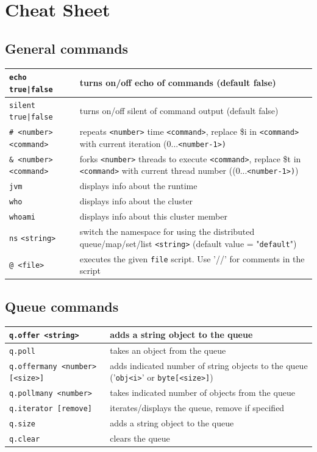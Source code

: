 \section{Cheat Sheet}
\subsection*{General commands}
\begin{tabular}{|p{4cm}|p{9cm}|}
    \hline
    \texttt{echo true|false} & turns on/off echo of commands (default false)\\\hline
    \texttt{silent true|false} & turns on/off silent of command output (default false)\\\hline
    \texttt{\# <number> <command>}& repeats \texttt{<number>} time \texttt{<command>}, replace \$i in \texttt{<command>} with current iteration (0...\texttt{<number-1>)}\\\hline
    \texttt{\& <number> <command>}& forks \texttt{<number>} threads to execute \texttt{<command>}, replace \$t in \texttt{<command>} with current thread number ((0...\texttt{<number-1>)})\\\hline
    \texttt{jvm} & displays info about the runtime\\\hline
    \texttt{who} & displays info about the cluster\\\hline
    \texttt{whoami} & displays info about this cluster member\\\hline
    \texttt{ns} \texttt{<string>} & switch the namespace for using the distributed queue/map/set/list \texttt{<string>} \newline (default value = "\texttt{default}")\\\hline
    \texttt{@ <file>} & executes the given \texttt{file} script. Use '//' for comments in the script\\\hline
\end{tabular}
\subsection*{Queue commands}
\begin{tabular}{|p{4cm}|p{9cm}|}
    \hline
    \texttt{q.offer <string>} & adds a string object to the queue\\\hline
    \texttt{q.poll} & takes an object from the queue\\\hline
    \texttt{q.offermany <number> [<size>]} & adds indicated number of string objects to the queue ('\texttt{obj<i>}' or \texttt{byte[<size>]})\\\hline
    \texttt{q.pollmany <number>} & takes indicated number of objects from the queue\\\hline
    \texttt{q.iterator [remove]} & iterates/displays the queue, remove if specified\\\hline
    \texttt{q.size} & adds a string object to the queue\\\hline
    \texttt{q.clear} & clears the queue\\\hline
\end{tabular}
